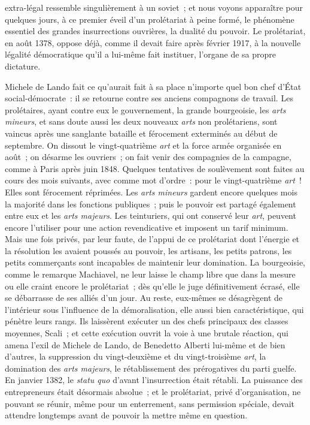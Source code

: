 \documentclass[french,twoside]{book} %
\begin{document}
extra-légal ressemble singulièrement à un soviet ; et nous voyons apparaître pour quel­ques jours, à ce premier éveil d'un prolétariat à peine formé, le phéno­mène essentiel des grandes insurrections ouvrières, la dualité du pouvoir. Le prolétariat, en août 1378, oppose déjà, comme il devait faire après février 1917, à la nouvelle légalité démocratique qu'il a lui-même fait instituer, l'organe de sa propre dictature.\par
Michele de Lando fait ce qu'aurait fait à sa place n'importe quel bon chef d'État social-démocrate : il se retourne contre ses anciens compagnons de travail. Les prolétaires, ayant contre eux le gouvernement, la grande bour­geoisie, les {\itshape arts mineurs}, et sans doute aussi les deux nouveaux {\itshape arts} non prolétariens, sont vaincus après une sanglante bataille et férocement extermi­nés au début de septembre. On dissout le vingt-quatrième {\itshape art} et la force armée organisée en août ; on désarme les ouvriers ; on fait venir des compagnies de la campagne, comme à Paris après juin 1848. Quelques tentatives de soulè­vement sont faites au cours des mois suivants, avec comme mot d'ordre : pour le vingt-quatrième {\itshape art} ! Elles sont férocement réprimées. Les {\itshape arts mineurs} gardent encore quelques mois la majorité dans les fonctions publiques ; puis le pouvoir est partagé également entre eux et les {\itshape arts majeurs}. Les teinturiers, qui ont conservé leur {\itshape art}, peuvent encore l'utiliser pour une action revendi­cative et imposent un tarif minimum. Mais une fois privés, par leur faute, de l'appui de ce prolétariat dont l'énergie et la résolution les avaient poussés au pouvoir, les artisans, les petits patrons, les petits commerçants sont incapables de maintenir leur domination. La bourgeoisie, comme le remarque Machiavel, ne leur laisse le champ libre que dans la mesure ou elle craint encore le prolétariat ; dès qu'elle le juge définitivement écrasé, elle se débarrasse de ses alliés d'un jour. Au reste, eux-mêmes se désagrègent de l'intérieur sous l'influence de la démoralisation, elle aussi bien caractéristique, qui pénètre leurs rangs. Ils laissèrent exécuter un des chefs principaux des classes moyen­nes, Scali ; et cette exécution ouvrit la voie à une brutale réaction, qui amena l'exil de Michele de Lando, de Benedetto Alberti lui-même et de bien d'autres, la suppression du vingt-deuxième et du vingt-troisième {\itshape art}, la domination des {\itshape arts majeurs}, le rétablissement des prérogatives du parti guelfe. En janvier 1382, le {\itshape statu quo} d'avant l'insurrection était rétabli. La puissance des entre­preneurs était désormais absolue ; et le prolétariat, privé d'organisation, ne pouvant se réunir, même pour un enterrement, sans permission spéciale, devait attendre longtemps avant de pouvoir la mettre même en question.\par
\end{document}
